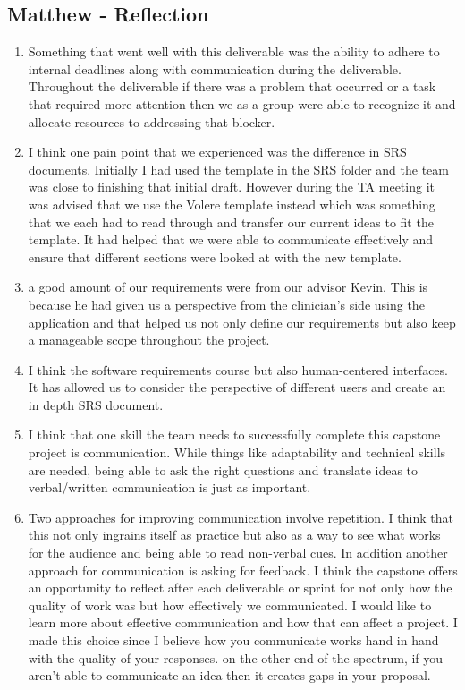 \documentclass[12pt]{article}
\begin{document}
\subsection*{Matthew - Reflection}
\begin{enumerate}
  \item Something that went well with this deliverable was the ability to adhere to internal deadlines along with communication during the deliverable. Throughout the deliverable if there was a problem that occurred or a task that required more attention then we as a group were able to recognize it and allocate resources to addressing that blocker.
  \item I think one pain point that we experienced was the difference in SRS documents. Initially I had used the template in the SRS folder and the team was close to finishing that initial draft. However during the TA meeting it was advised that we use the Volere template instead which was something that we each had to read through and transfer our current ideas to fit the template. It had helped that we were able to communicate effectively and ensure that different sections were looked at with the new template.
  \item a good amount of our requirements were from our advisor Kevin. This is because he had given us a perspective from the clinician's side using the application and that helped us not only define our requirements but also keep a manageable scope throughout the project.
  \item I think the software requirements course but also human-centered interfaces. It has allowed us to consider the perspective of different users and create an in depth SRS document. 
  \item I think that one skill the team needs to successfully complete this capstone project is communication. While things like adaptability and technical skills are needed, being able to ask the right questions and translate ideas to verbal/written communication is just as important.
  \item Two approaches for improving communication involve repetition. I think that this not only ingrains itself as practice but also as a way to see what works for the audience and being able to read non-verbal cues. In addition another approach for communication is asking for feedback. I think the capstone offers an opportunity to reflect after each deliverable or sprint for not only how the quality of work was but how effectively we communicated. I would like to learn more about effective communication and how that can affect a project. I made this choice since I believe how you communicate works hand in hand with the quality of your responses. on the other end of the spectrum, if you aren't able to communicate an idea then it creates gaps in your proposal. \\
\end{enumerate}
\end{document}
